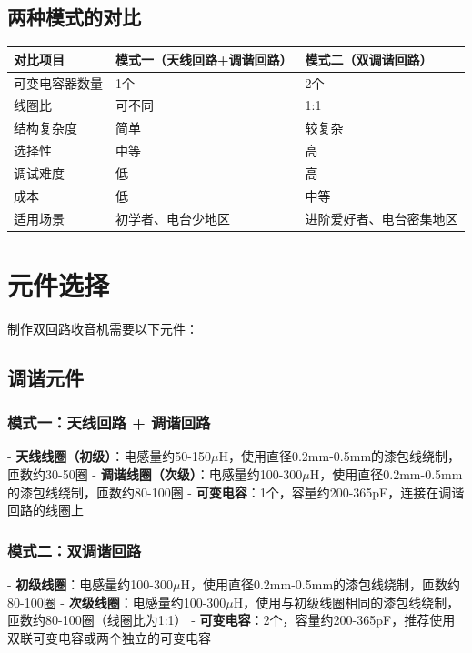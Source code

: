 \documentclass[12pt,UTF8]{ctexbook}
\begin{document}
\subsection{两种模式的对比}

\begin{tabular}{|l|l|l|}
\hline
\textbf{对比项目} & \textbf{模式一（天线回路+调谐回路）} & \textbf{模式二（双调谐回路）} \\
\hline
可变电容器数量 & 1个 & 2个 \\
\hline
线圈比 & 可不同 & 1:1 \\
\hline
结构复杂度 & 简单 & 较复杂 \\
\hline
选择性 & 中等 & 高 \\
\hline
调试难度 & 低 & 高 \\
\hline
成本 & 低 & 中等 \\
\hline
适用场景 & 初学者、电台少地区 & 进阶爱好者、电台密集地区 \\
\hline
\end{tabular}

\section{元件选择}

制作双回路收音机需要以下元件：

\subsection{调谐元件}

\subsubsection{模式一：天线回路 + 调谐回路}
- \textbf{天线线圈（初级）}：电感量约50-150$\mu$H，使用直径0.2mm-0.5mm的漆包线绕制，匝数约30-50圈
- \textbf{调谐线圈（次级）}：电感量约100-300$\mu$H，使用直径0.2mm-0.5mm的漆包线绕制，匝数约80-100圈
- \textbf{可变电容}：1个，容量约200-365pF，连接在调谐回路的线圈上

\subsubsection{模式二：双调谐回路}
- \textbf{初级线圈}：电感量约100-300$\mu$H，使用直径0.2mm-0.5mm的漆包线绕制，匝数约80-100圈
- \textbf{次级线圈}：电感量约100-300$\mu$H，使用与初级线圈相同的漆包线绕制，匝数约80-100圈（线圈比为1:1）
- \textbf{可变电容}：2个，容量约200-365pF，推荐使用双联可变电容或两个独立的可变电容
\end{document}
